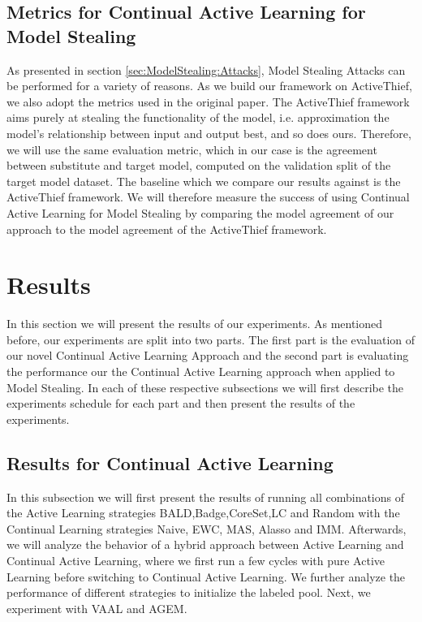\subsection{Metrics for Continual Active Learning for Model Stealing}
\label{sec:Evaluation:Metrics:CALMS}
As presented in section \ref{sec:ModelStealing:Attacks}, Model Stealing Attacks can be performed for a variety of reasons. As we build our framework on ActiveThief, we also
adopt the metrics used in the original paper. The ActiveThief framework aims purely at stealing the functionality of the model, i.e. approximation the model's relationship
between input and output best, and so does ours. Therefore, we will use the same evaluation metric, which in our case is the agreement between substitute and target model,
computed on the validation split of the target model dataset. The baseline which we compare our results against is the ActiveThief framework. We will therefore measure the 
success of using Continual Active Learning for Model Stealing by comparing the model agreement of our approach to the model agreement of the ActiveThief framework.

\section{Results}
\label{sec:Evaluation:Results}
In this section we will present the results of our experiments. As mentioned before, our experiments are split into two parts. The first part is the evaluation of our novel
Continual Active Learning Approach and the second part is evaluating the performance our the Continual Active Learning approach when applied to Model Stealing. In each of these
respective subsections we will first describe the experiments schedule for each part and then present the results of the experiments.

\subsection{Results for Continual Active Learning}
\label{sec:Evaluation:Results:CAL}
In this subsection we will first present the results of running all combinations of the Active Learning strategies BALD,Badge,CoreSet,LC and Random with the Continual Learning strategies
Naive, EWC, MAS, Alasso and IMM. Afterwards, we will analyze the behavior of a hybrid approach between Active Learning and Continual Active Learning, where we first run a few cycles with
pure Active Learning before switching to Continual Active Learning. We further analyze the performance of different strategies to initialize the labeled pool. Next, we experiment with VAAL
and AGEM.

